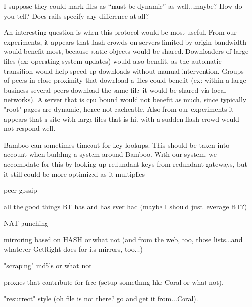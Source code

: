 I suppose they could mark files as ``must be dynamic'' as well...maybe?  How do you tell?  Does rails specify any difference at all?


An interesting question is when this protocol would be most useful. From our experiments, it appears that
flash crowds on servers limited by origin bandwidth would benefit most, because static objects would
be shared.  Downloaders of large files (ex: operating
system updates) would also benefit, as the automatic transition would help speed up downloads without
manual intervention.
Groups of peers in close proximity that download a files could benefit (ex: within a large business several
peers download the same file--it would be shared via local networks). 
A server that is cpu bound would not benefit as much, since typically "root" pages are dynamic, hence not cacheable.
Also from our experiments it appears that a site with large files that is hit with a sudden flash crowd would not respond well.

Bamboo can sometimes timeout for key lookups. %
This should be taken into account when building a system around Bamboo.
With our system, we accomodate for this by looking up redundant keys from redundant gateways, but it still
could be more optimized as it multiplies 


peer gossip

all the good things BT has and has ever had (maybe I should just leverage BT?)

NAT punching

mirroring based on HASH or what not (and from the web, too, those lists...and whatever GetRight does for its
mirrors, too...)

"scraping" md5's or what not

proxies that contribute for free (setup something like Coral or what not).

"resurrect" style (oh file is not there? go and get it from...Coral).

